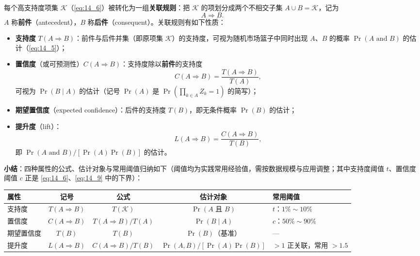 \begin{definition}[关联规则及其属性]
每个高支持度项集 $\mathcal{K}$（\eqref{eq:14_6}）被转化为一组\textbf{关联规则}：把 $\mathcal{K}$ 的项划分成两个不相交子集 $A\cup B=\mathcal{K}$，记为
\begin{equation}
A \Rightarrow B. \label{eq:14_7}
\end{equation}
$A$ 称\textbf{前件}（antecedent），$B$ 称\textbf{后件}（consequent）。关联规则有如下性质：
\begin{itemize}[itemsep=1pt]
\item \textbf{支持度} $T(A\Rightarrow B)$：前件与后件并集（即原项集 $\mathcal{K}$）的支持度，可视为随机市场篮子中同时出现 $A$、$B$ 的概率 $\Pr(A\text{ and }B)$ 的估计（\eqref{eq:14_5}）；
\item \textbf{置信度}（或可预测性）$C(A\Rightarrow B)$：支持度除以\textbf{前件}的支持度
\begin{equation}
C(A\Rightarrow B) = \frac{T(A\Rightarrow B)}{T(A)}, \label{eq:14_8}
\end{equation}
可视为 $\Pr(B\mid A)$ 的估计（记号 $\Pr(A)$ 是 $\Pr(\prod_{k\in A}Z_k=1)$ 的简写）；
\item \textbf{期望置信度}（expected confidence）：后件的支持度 $T(B)$，即无条件概率 $\Pr(B)$ 的估计；
\item \textbf{提升度}（lift）：
\[
L(A\Rightarrow B) = \frac{C(A\Rightarrow B)}{T(B)},
\]
即 $\Pr(A \text{ and } B)/[\Pr(A)\Pr(B)]$ 的估计。
\end{itemize}

\medskip
\noindent\textbf{小结}：四种属性的公式、估计对象与常用阈值归纳如下（阈值均为实践常用经验值，需按数据规模与应用调整；其中支持度阈值 $t$、置信度阈值 $c$ 正是 \eqref{eq:14_6}、\eqref{eq:14_9} 中的下界）：
\begin{center}
\begin{tabular}{lcccl}
\toprule
属性 & 记号 & 公式 & 估计对象 & 常用阈值 \\
\midrule
支持度 & $T(A\Rightarrow B)$ & $T(\mathcal{K})$ & $\Pr(A\text{ 且 }B)$ & $t$：$1\%\sim 10\%$ \\
置信度 & $C(A\Rightarrow B)$ & $T(A\Rightarrow B)/T(A)$ & $\Pr(B\mid A)$ & $c$：$50\%\sim 90\%$ \\
期望置信度 & $T(B)$ & $T(B)$ & $\Pr(B)$（基准） & --- \\
提升度 & $L(A\Rightarrow B)$ & $C(A\Rightarrow B)/T(B)$ & $\Pr(A,B)/[\Pr(A)\Pr(B)]$ & $>1$ 正关联，常用 $>1.5$ \\
\bottomrule
\end{tabular}
\end{center}
\end{definition}

